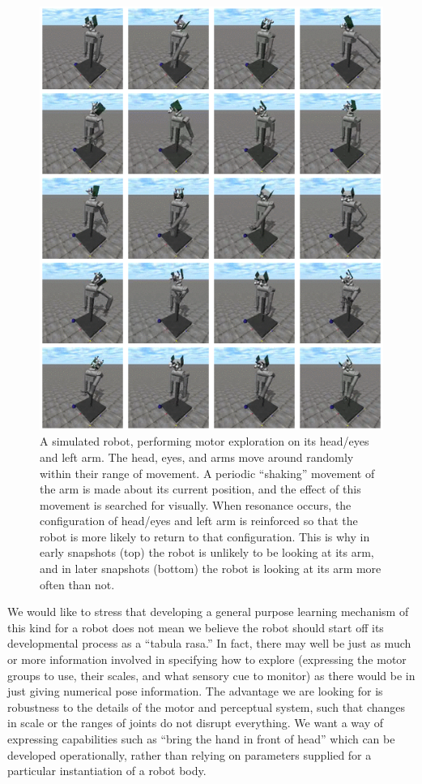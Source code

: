 \begin{figure}[p]
\centerline{\includegraphics[width=\textwidth]{images/find-arm}}
\caption{
%
\label{fig:find-arm}
%
A simulated robot, performing motor exploration on its
head/eyes and left arm.  The head, eyes, and arms move around randomly
within their range of movement.
%
A periodic ``shaking'' movement of the arm is made about its
current position, and the effect of this movement is searched 
for visually.
%
When resonance occurs, the configuration of head/eyes and left arm
is reinforced so that the robot is more likely to return to that
configuration.
%
This is why 
in early snapshots (top) the robot is unlikely to be looking at 
its arm, and in later snapshots (bottom) the robot is looking at
its arm more often than not.
%
}
\end{figure}


We would like to stress that developing a general purpose learning
mechanism of this kind for a robot does not mean we believe the robot
should start off its developmental process as a ``tabula rasa.''  In
fact, there may well be just as much or more information involved in
specifying how to explore (expressing the motor groups to use, their
scales, and what sensory cue to monitor) as there would be in just
giving numerical pose information.
%
The advantage we are looking for is robustness to the details of 
the motor and perceptual system, such that changes in scale or the
ranges of joints do not disrupt everything.
%
We want a way of expressing capabilities such as ``bring the hand in
front of head'' which can be developed operationally, rather than
relying on parameters supplied for a particular instantiation
of a robot body.

